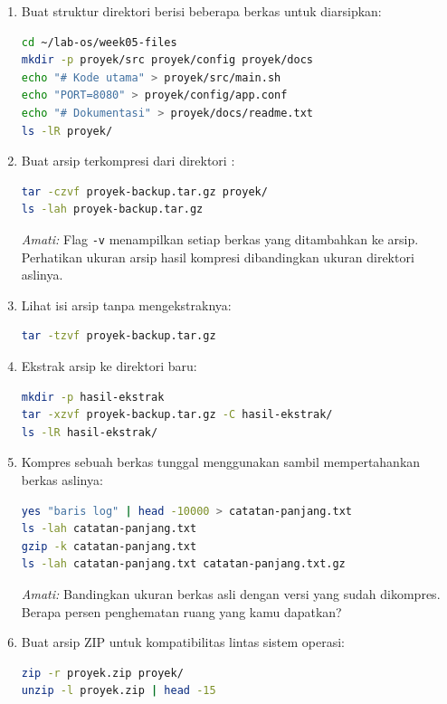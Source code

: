 \begin{enumerate}
    \item Buat struktur direktori berisi beberapa berkas untuk diarsipkan:
\begin{lstlisting}[language=bash, caption={Menyiapkan direktori yang akan diarsipkan}]
cd ~/lab-os/week05-files
mkdir -p proyek/src proyek/config proyek/docs
echo "# Kode utama" > proyek/src/main.sh
echo "PORT=8080" > proyek/config/app.conf
echo "# Dokumentasi" > proyek/docs/readme.txt
ls -lR proyek/
\end{lstlisting}

    \item Buat arsip terkompresi dari direktori :
\begin{lstlisting}[language=bash, caption={Membuat arsip .tar.gz}]
tar -czvf proyek-backup.tar.gz proyek/
ls -lah proyek-backup.tar.gz
\end{lstlisting}
    \textit{Amati:} Flag \texttt{-v} menampilkan setiap berkas yang ditambahkan ke arsip. Perhatikan ukuran arsip hasil kompresi dibandingkan ukuran direktori aslinya.

    \item Lihat isi arsip tanpa mengekstraknya:
\begin{lstlisting}[language=bash, caption={Melihat isi arsip tanpa ekstrak}]
tar -tzvf proyek-backup.tar.gz
\end{lstlisting}

    \item Ekstrak arsip ke direktori baru:
\begin{lstlisting}[language=bash, caption={Mengekstrak arsip ke direktori lain}]
mkdir -p hasil-ekstrak
tar -xzvf proyek-backup.tar.gz -C hasil-ekstrak/
ls -lR hasil-ekstrak/
\end{lstlisting}

    \item Kompres sebuah berkas tunggal menggunakan  sambil mempertahankan berkas aslinya:
\begin{lstlisting}[language=bash, caption={Kompresi berkas tunggal dengan gzip}]
yes "baris log" | head -10000 > catatan-panjang.txt
ls -lah catatan-panjang.txt
gzip -k catatan-panjang.txt
ls -lah catatan-panjang.txt catatan-panjang.txt.gz
\end{lstlisting}
    \textit{Amati:} Bandingkan ukuran berkas asli dengan versi yang sudah dikompres. Berapa persen penghematan ruang yang kamu dapatkan?

    \item Buat arsip ZIP untuk kompatibilitas lintas sistem operasi:
\begin{lstlisting}[language=bash, caption={Membuat arsip ZIP}]
zip -r proyek.zip proyek/
unzip -l proyek.zip | head -15
\end{lstlisting}
\end{enumerate}

